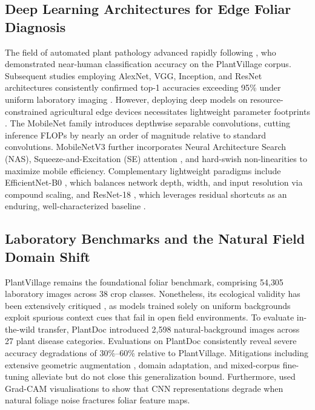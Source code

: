 \documentclass[pdflatex,sn-mathphys-num]{sn-jnl}
\theoremstyle{thmstyleone}%
\theoremstyle{thmstyletwo}%
\theoremstyle{thmstylethree}%
\begin{document}
\subsection{Deep Learning Architectures for Edge Foliar Diagnosis}
The field of automated plant pathology advanced rapidly following \citet{mohanty2016}, who demonstrated near-human classification accuracy on the PlantVillage corpus. Subsequent studies employing AlexNet, VGG, Inception, and ResNet architectures consistently confirmed top-1 accuracies exceeding 95\% under uniform laboratory imaging \citep{ferentinos2018deep,too2019comparative,kamilaris2018deep}. However, deploying deep models on resource-constrained agricultural edge devices necessitates lightweight parameter footprints \citep{howard2017mobilenets}. The MobileNet family introduces depthwise separable convolutions, cutting inference FLOPs by nearly an order of magnitude relative to standard convolutions. MobileNetV3 \citep{howard2019mobilenetv3} further incorporates Neural Architecture Search (NAS), Squeeze-and-Excitation (SE) attention \citep{hu2018squeeze}, and hard-swish non-linearities to maximize mobile efficiency. Complementary lightweight paradigms include EfficientNet-B0 \citep{tan2019efficientnet}, which balances network depth, width, and input resolution via compound scaling, and ResNet-18 \citep{he2016resnet}, which leverages residual shortcuts as an enduring, well-characterized baseline \citep{atila2021plant}.

\subsection{Laboratory Benchmarks and the Natural Field Domain Shift}
PlantVillage \citep{hughes2015plantvillage} remains the foundational foliar benchmark, comprising 54{,}305 laboratory images across 38 crop classes. Nonetheless, its ecological validity has been extensively critiqued \citep{barbedo2016review,toda2019deep,dsouza2023generalization}, as models trained solely on uniform backgrounds exploit spurious context cues that fail in open field environments. To evaluate in-the-wild transfer, PlantDoc \citep{singh2020plant} introduced 2{,}598 natural-background images across 27 plant disease categories. Evaluations on PlantDoc consistently reveal severe accuracy degradations of 30\%--60\% relative to PlantVillage. Mitigations including extensive geometric augmentation \citep{shorten2019survey}, domain adaptation, and mixed-corpus fine-tuning \citep{kwak2023effect} alleviate but do not close this generalization bound. Furthermore, \citet{toda2019deep} used Grad-CAM visualisations \citep{selvaraju2017gradcam} to show that CNN representations degrade when natural foliage noise fractures foliar feature maps.
\end{document}
